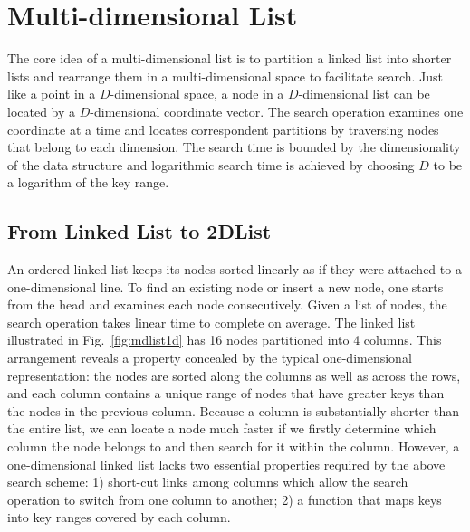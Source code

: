 \documentclass[10pt,journal,letterpaper,compsoc]{IEEEtran}
\begin{document}


\section{Multi-dimensional List}
\label{sec:mdlist}
The core idea of a multi-dimensional list is to partition a linked list into shorter lists and rearrange them in a multi-dimensional space to facilitate search.
Just like a point in a $D$-dimensional space, a node in a $D$-dimensional list can be located by a $D$-dimensional coordinate vector.
The search operation examines one coordinate at a time and locates correspondent partitions by traversing nodes that belong to each dimension. 
The search time is bounded by the dimensionality of the data structure and logarithmic search time is achieved by choosing $D$ to be a logarithm of the key range. 

\subsection{From Linked List to 2DList}
\label{sec:mdlist-overview}
An ordered linked list keeps its nodes sorted linearly as if they were attached to a one-dimensional line.
To find an existing node or insert a new node, one starts from the head and examines each node consecutively.
Given a list of nodes, the search operation takes linear time to complete on average.
The linked list illustrated in Fig.~\ref{fig:mdlist1d} has 16 nodes partitioned into 4 columns. 
This arrangement reveals a property concealed by the typical one-dimensional representation: the nodes are sorted along the columns as well as across the rows, and each column contains a unique range of nodes that have greater keys than the nodes in the previous column.
Because a column is substantially shorter than the entire list, we can locate a node much faster if we firstly determine which column the node belongs to and then search for it within the column. 
However, a one-dimensional linked list lacks two essential properties required by the above search scheme: 1) short-cut links among columns which allow the search operation to switch from one column to another; 2) a function that maps keys into key ranges covered by each column.
\end{document}
